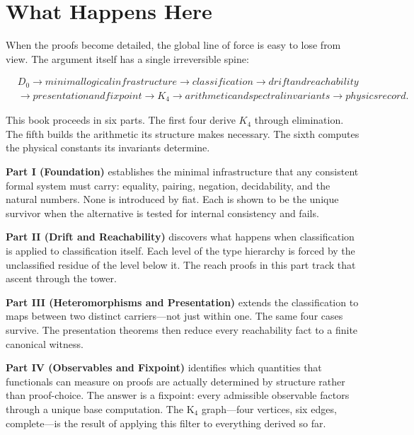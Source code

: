 \documentclass[11pt,a4paper]{book}
\def\text#1{#1}%
\begin{document}
\section{What Happens Here}

When the proofs become detailed, the global line of force is easy to lose from view. The argument itself has a single irreversible spine:

\[
\begin{aligned}
  & D_0
  \longrightarrow
  \text{minimal logical infrastructure}
  \longrightarrow
  \text{classification}
  \longrightarrow
  \text{drift and reachability} \\
  & \longrightarrow
  \text{presentation and fixpoint}
  \longrightarrow
  K_4
  \longrightarrow
  \text{arithmetic and spectral invariants}
  \longrightarrow
  \text{physics record.}
\end{aligned}
\]

This book proceeds in six parts. The first four derive $K_4$ through elimination. The fifth builds the arithmetic its structure makes necessary. The sixth computes the physical constants its invariants determine.

\textbf{Part I (Foundation)} establishes the minimal infrastructure that any consistent formal system must carry: equality, pairing, negation, decidability, and the natural numbers. None is introduced by fiat. Each is shown to be the unique survivor when the alternative is tested for internal consistency and fails.

\textbf{Part II (Drift and Reachability)} discovers what happens when classification is applied to classification itself. Each level of the type hierarchy is forced by the unclassified residue of the level below it. The reach proofs in this part track that ascent through the tower.

\textbf{Part III (Heteromorphisms and Presentation)} extends the classification to maps between two distinct carriers---not just within one. The same four cases survive. The presentation theorems then reduce every reachability fact to a finite canonical witness.

\textbf{Part IV (Observables and Fixpoint)} identifies which quantities that functionals can measure on proofs are actually determined by structure rather than proof-choice. The answer is a fixpoint: every admissible observable factors through a unique base computation. The K$_4$ graph---four vertices, six edges, complete---is the result of applying this filter to everything derived so far.
\end{document}
